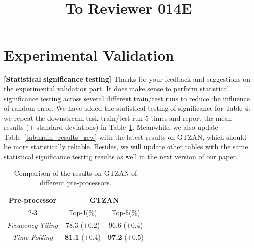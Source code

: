 \documentclass{article}
\title{To Reviewer 014E}
\begin{document}
\maketitle

\section{Experimental Validation}

\textbf{[Statistical significance testing]} Thanks for your feedback and suggestions on the experimental validation part. It does make sense to perform statistical significance testing across several different train/test runs to reduce the influence of random error. We have added the statistical testing of significance for Table 4: we repeat the downstream task train/test run 5 times and report the mean results ($\pm$ standard deviations) in Table~\ref{tab:pre_processor_new}. Meanwhile, we also update Table~\ref{tab:main_results_new} with the latest results on GTZAN, which should be more statistically reliable. Besides, we will update other tables with the same statistical significance testing results as well in the next version of our paper.

\begin{table}[t]
\centering
\setlength\tabcolsep{20pt}
\small 
\begin{tabular}{ c | c  c }
	\toprule
	\multirow{2}{*}[-0.7ex]{Pre-processor} & \multicolumn{2}{c}{GTZAN} \\
	\cmidrule(lr){2-3}
	& Top-1(\%) & Top-5(\%) \\
	\midrule
	\textit{Frequency Tiling} & 78.3 ($\pm{0.2}$) & 96.6 ($\pm{0.4}$) \\
    \textit{Time Folding} & \textbf{81.1} ($\pm{0.4}$) & \textbf{97.2} ($\pm{0.5}$) \\
	\bottomrule
\end{tabular}
\vspace{-0.2cm}
\caption{Comparison of the results on GTZAN of different pre-processors.}
\label{tab:pre_processor_new}
\vspace{-0.5cm}
\end{table}
\end{document}

